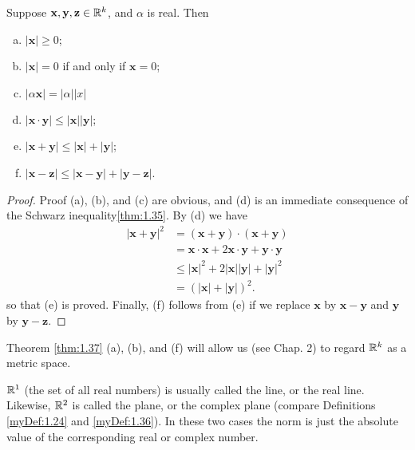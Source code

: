 \begin{thm}\label{thm:1.37}
    Suppose $\mathbf{x}, \mathbf{y}, \mathbf{z}\in{\protect\mathbb R}^k$, and $\alpha$ is real. Then
    \begin{enumerate}[(a)]
        \item $| \mathbf{x}| \geq 0$;
        \item $| \mathbf{x}| = 0$ if and only if $\mathbf{x} =0$;
        \item $| \alpha \mathbf{x}| = | \alpha||x|$
        \item $|\mathbf{x}\cdot\mathbf{y}| \leq  |\mathbf{x}| | \mathbf{y}|$;
        \item $|\mathbf{x}+\mathbf{y}| \leq | \mathbf{x} | + | \mathbf{y}|$;
        \item $|\mathbf{x}-\mathbf{z}| \leq |\mathbf{x}-\mathbf{y}| + |\mathbf{y}-\mathbf{z}|$.
    \end{enumerate}
\end{thm}


\begin{proof}
    Proof (a), (b), and (c) are obvious, and (d) is an immediate consequence of the Schwarz inequality\ref{thm:1.35}. 
    By (d) we have 
    \begin{align*}
        |\mathbf{x} + \mathbf{y}|^2
        &= (\mathbf{x} + \mathbf{y}) \cdot (\mathbf{x} + \mathbf{y})\\
        &= \mathbf{x} \cdot \mathbf{x} + 2\mathbf{x} \cdot \mathbf{y} + \mathbf{y} \cdot \mathbf{y}\\
        &\leq |\mathbf{x}|^2 + 2|\mathbf{x}||\mathbf{y}| + |\mathbf{y}|^2\\
        &= \left(|\mathbf{x}| + |\mathbf{y}|\right)^2.
    \end{align*}
    so that (e) is proved. Finally, 
    (f) follows from (e) if we 
    replace $\mathbf{x}$ by $\mathbf{x}-\mathbf{y}$ 
    and $\mathbf{y}$ by $\mathbf{y}-\mathbf{z}$.
\end{proof}

\begin{myRemark}
    \label{myRemark:1.38}
    Theorem \ref{thm:1.37} (a), (b), and (f) will allow us (see Chap. 2) to
    regard ${\protect\mathbb R}^k$ as a metric space.
    
    ${\protect\mathbb R}^1$ (the set of all real numbers) is usually called the line, 
    or the real line. 
    Likewise, ${\protect\mathbb R}^2$ is called the plane, or the complex plane (compare Definitions \ref{myDef:1.24} and \ref{myDef:1.36}). 
    In these two cases the norm is just the absolute value of the corresponding real or complex number. 
\end{myRemark}

